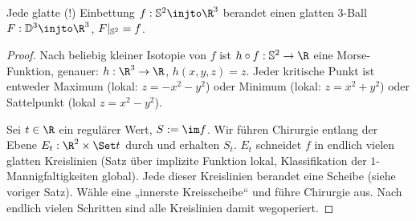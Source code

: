 \begin{st}
    Jede glatte (!) Einbettung $f: \S^2 \injto \R^3$ berandet einen glatten $3$-Ball $F: \D^3 \injto \R^3$, $F|_{\S^2} = f$.
    \begin{proof}
        Nach beliebig kleiner Isotopie von $f$ ist $h \circ f: \S^2 \to \R$ eine Morse-Funktion, genauer: $h: \R^3 \to \R$, $h(x,y,z) = z$.
        Jeder kritische Punkt ist entweder Maximum (lokal: $z = -x^2-y^2$) oder Minimum (lokal: $z = x^2 + y^2$) oder Sattelpunkt (lokal $z = x^2 - y^2$).

        Sei $t \in \R$ ein regulärer Wert, $S := \im f$.
        Wir führen Chirurgie entlang der Ebene $E_t: \R^2 \times \Set t$ durch und erhalten $S_t$.
        $E_t$ schneidet $f$ in endlich vielen glatten Kreislinien (Satz über implizite Funktion lokal, Klassifikation der $1$-Mannigfaltigkeiten global).
        Jede dieser Kreislinien berandet eine Scheibe (siehe voriger Satz).
        Wähle eine „innerste Kreisscheibe“ und führe Chirurgie aus.
        Nach endlich vielen Schritten sind alle Kreislinien damit wegoperiert.


\end{proof}
\end{st}

